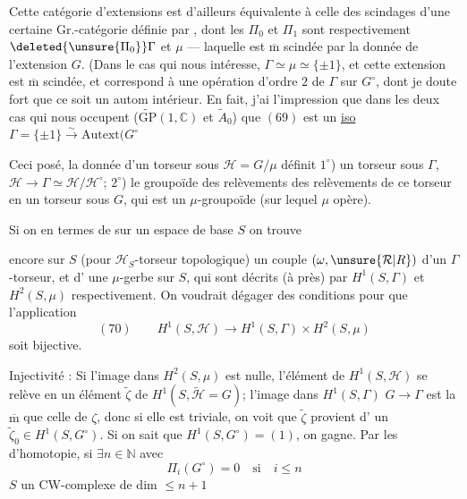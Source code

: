 Cette catégorie d'extensions est d'ailleurs équivalente
à celle des scindages d'une certaine
Gr.-catégorie définie par , dont les $\Pi_0$ et
$\Pi_1$ sont respectivement $\deleted{\unsure{\Pi_0}}\Gamma$ et $\mu$ --- laquelle
est  $\overline{\mathrm m}$ scindée par la donnée de l'extension
$G$. (Dans le cas qui nous intéresse,
$\Gamma\simeq\mu\simeq\{\pm1\}$, et
cette extension est $\overline{\mathrm m}$ scindée, et correspond
à une opération d'ordre $2$ de $\Gamma$ sur $G^\circ$,
dont je doute fort que ce soit un autom intérieur.
En fait, j'ai l'impression que dans les
deux cas qui nous occupent ($\widetilde{\mathrm{GP}}(1,\mathbb C)$ et
$\widetilde A_0$) que $(69)$ est un \uline{iso}
$\Gamma=\{\pm1\}\xrightarrow{\sim}\mathrm{Autext}(G^\circ$

Ceci posé, la donnée d'un torseur sous
$\mathcal H=G/\mu$ définit $1^\circ$) un torseur sous $\Gamma$,
$\mathcal H\longrightarrow\Gamma\simeq\mathcal H/\mathcal H^\circ$; $2^\circ$) le groupoïde des
relèvements des relèvements de ce torseur
en un torseur sous $G$, qui est un
$\mu$-groupoïde  (sur lequel $\mu$ opère).

Si on   en termes de 
sur un espace de base $S$ on trouve

encore sur $S$ (pour  $\mathcal H_S$-torseur topologique)
un couple $(\omega,\unsure{\mathcal R|R})$ d'un $\Gamma$-torseur, et d'
une $\mu$-gerbe sur $S$, qui sont décrits (à 
  près) par $H^1(S,\Gamma)$ et $H^2(S,\mu)$
respectivement. On voudrait dégager des
conditions  pour que l'application
\[
(70)\qquad H^1(S,\mathcal H)\longrightarrow H^1(S,\Gamma)\times H^2(S,\mu)
\]
soit bijective.

Injectivité : Si l'image 
dans $H^2(S,\mu)$ est nulle,
l'élément de $H^1(S,\mathcal H)$ se relève en un élément $\widetilde\zeta$
de $H^1(S,\widetilde{\mathcal H}=G)$;  l'image dans $H^1(S,\Gamma)$
 $G\longrightarrow\Gamma$ est la $\overline{\mathrm m}$ que celle de $\zeta$, donc si
elle est triviale, on voit que $\widetilde\zeta$ provient d'
un $\widetilde\zeta_0\in H^1(S,G^\circ)$. Si on sait que
$H^1(S,G^\circ)=(1)$, on gagne. Par les
 d'homotopie, 
si $\exists n\in\mathbb N$ avec
\[
\Pi_i(G^\circ)=0\quad\text{si}\quad i\leq n
\]
$S$ un CW-complexe de dim $\leq n+1$

